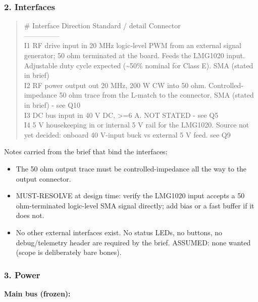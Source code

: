 \documentclass[11pt,a4paper]{article}
\begin{document}
\subsubsection*{2. Interfaces}
\begin{quote}\small\ttfamily\raggedright
\textbar{} \# \textbar{} Interface \textbar{} Direction \textbar{} Standard / detail \textbar{} Connector \textbar{}\\
\textbar{}---\textbar{}---\textbar{}---\textbar{}---\textbar{}---\textbar{}\\
\textbar{} I1 \textbar{} RF drive input \textbar{} in \textbar{} 20 MHz logic-level PWM from an external signal generator; 50 ohm terminated at the board. Feeds the LMG1020 input. Adjustable duty cycle expected (\textasciitilde{}50\% nominal for Class E). \textbar{} SMA (stated in brief) \textbar{}\\
\textbar{} I2 \textbar{} RF power output \textbar{} out \textbar{} 20 MHz, 200 W CW into 50 ohm. Controlled-impedance 50 ohm trace from the L-match to the connector. \textbar{} SMA (stated in brief) - see Q10 \textbar{}\\
\textbar{} I3 \textbar{} DC bus input \textbar{} in \textbar{} 40 V DC, \textgreater{}=6 A. \textbar{} NOT STATED - see Q5 \textbar{}\\
\textbar{} I4 \textbar{} 5 V housekeeping \textbar{} in or internal \textbar{} 5 V rail for the LMG1020. Source not yet decided: onboard 40 V-input buck vs external 5 V feed. \textbar{} see Q9 \textbar{}
\end{quote}
Notes carried from the brief that bind the interfaces:

\begin{itemize}
\item The 50 ohm output trace must be controlled-impedance all the way to the output connector.
\item MUST-RESOLVE at design time: verify the LMG1020 input accepts a 50 ohm-terminated logic-level
SMA signal directly; add bias or a fast buffer if it does not.
\item No other external interfaces exist. No status LEDs, no buttons, no debug/telemetry header are
required by the brief. ASSUMED: none wanted (scope is deliberately bare bones).
\end{itemize}
\subsubsection*{3. Power}
\textbf{Main bus (frozen):}
\end{document}
